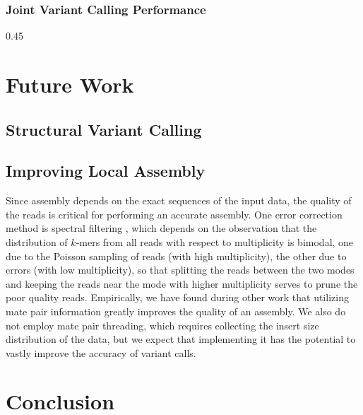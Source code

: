 \documentclass{acm_proc_article-sp}
\begin{document}
\subsubsection{Joint Variant Calling Performance}
\label{sec:jvc-performance}

0.45

\section{Future Work}
\label{sec:future-work}


\subsection{Structural Variant Calling}
\label{sec:structural-variant-callling}

\subsection{Improving Local Assembly}
\label{sec:improving-local-assembly}

Since assembly depends on the exact sequences of the input data, the quality of
the reads is critical for performing an accurate assembly.
One error correction method is spectral filtering \cite{pevzner01}, which depends
on the observation that the distribution of $k$-mers from all reads with respect to
multiplicity is bimodal, one due to the Poisson sampling of reads (with high
multiplicity), the other due to errors (with low multiplicity), so that splitting
the reads between the two modes and keeping the reads near the mode with higher
multiplicity serves to prune the poor quality reads.
Empirically, we have found during other work that utilizing mate pair
information greatly improves the quality of an assembly. %
We also do not employ mate pair threading, which requires collecting the
insert size distribution of the data, but we expect that implementing it has
the potential to vastly improve the accuracy of variant calls.

\section{Conclusion}
\label{sec:conclusion}
\end{document}
